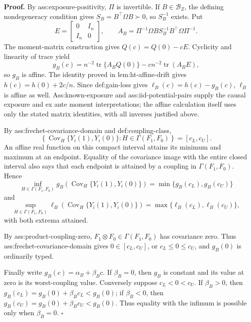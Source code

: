 \textbf{Proof.}
By ass:exposure-positivity, \(\Pi\) is invertible.  If \(B\in\mathcal B_Z\), the defining nondegeneracy condition gives \(S_B=B^{\top}\Omega B\succ0\), so \(S_B^{-1}\) exists.  Put
\[
E=\begin{bmatrix}0&I_n\\ I_n&0\end{bmatrix},
\qquad
A_B=\Pi^{-1}\Omega B S_B^{-1}B^{\top}\Omega\Pi^{-1}.
\]
The moment-matrix construction gives \(Q(c)=Q(0)-cE\).  Cyclicity and linearity of trace yield
\[
g_B(c)=n^{-2}\operatorname{tr}\{A_BQ(0)\}
-c n^{-2}\operatorname{tr}(A_BE),
\]
so \(g_B\) is affine.  The identity proved in lem:ht-affine-drift gives \(h(c)=h(0)+2c/n\).  Since def:gain-loss gives \(\ell_B(c)=h(c)-g_B(c)\), \(\ell_B\) is affine as well.  Ass:known-exposure and ass:iid-potential-pairs supply the causal exposure and ex ante moment interpretations; the affine calculation itself uses only the stated matrix identities, with all inverses justified above.

By ass:frechet-covariance-domain and def:coupling-class,
\[
\left\{\operatorname{Cov}_H\{Y_i(1),Y_i(0)\}:H\in\Gamma(F_1,F_0)\right\}
=[c_L,c_U].
\]
An affine real function on this compact interval attains its minimum and maximum at an endpoint.  Equality of the covariance image with the entire closed interval also says that each endpoint is attained by a coupling in \(\Gamma(F_1,F_0)\).  Hence
\[
\inf_{H\in\Gamma(F_1,F_0)}
g_B\!\left(\operatorname{Cov}_H\{Y_i(1),Y_i(0)\}\right)
=\min\{g_B(c_L),g_B(c_U)\}
\]
and
\[
\sup_{H\in\Gamma(F_1,F_0)}
\ell_B\!\left(\operatorname{Cov}_H\{Y_i(1),Y_i(0)\}\right)
=\max\{\ell_B(c_L),\ell_B(c_U)\},
\]
with both extrema attained.

By ass:product-coupling-zero, \(F_1\otimes F_0\in\Gamma(F_1,F_0)\) has covariance zero.  Thus ass:frechet-covariance-domain gives \(0\in[c_L,c_U]\), or \(c_L\le0\le c_U\), and \(g_B(0)\) is ordinarily typed.

Finally write \(g_B(c)=\alpha_B+\beta_Bc\).  If \(\beta_B=0\), then \(g_B\) is constant and its value at zero is its worst-coupling value.  Conversely suppose \(c_L<0<c_U\).  If \(\beta_B>0\), then \(g_B(c_L)=g_B(0)+\beta_Bc_L<g_B(0)\); if \(\beta_B<0\), then \(g_B(c_U)=g_B(0)+\beta_Bc_U<g_B(0)\).  Thus equality with the infimum is possible only when \(\beta_B=0\). \(\square\)